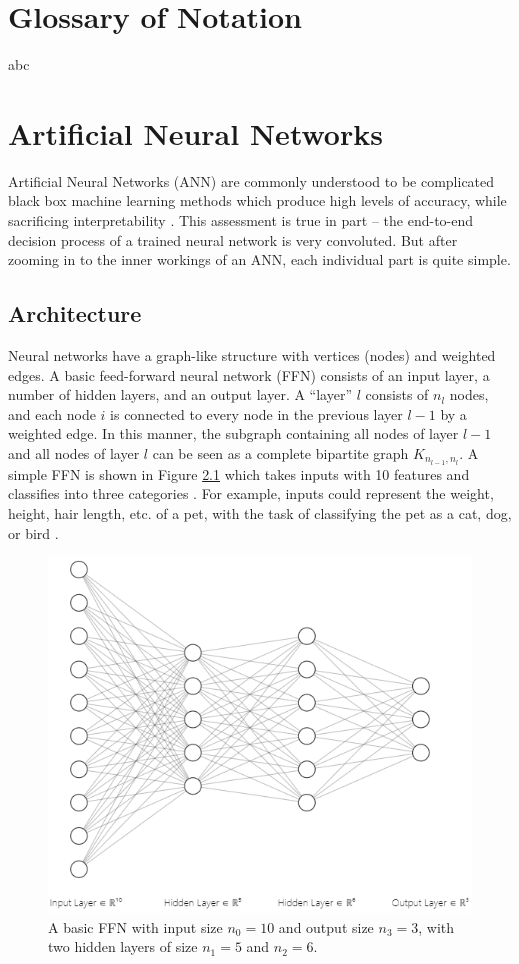 
\appendix \label{apdx}

\chapter{Glossary of Notation}
abc


\chapter{Artificial Neural Networks} \label{apdx:ann}
Artificial Neural Networks (ANN) are commonly understood to be complicated black box machine learning methods which produce high levels of accuracy, while sacrificing interpretability \cite{pattern_rec_book}. This assessment is true in part -- the end-to-end decision process of a trained neural network is very convoluted. But after zooming in to the inner workings of an ANN, each individual part is quite simple.

\section{Architecture}
Neural networks have a graph-like structure with vertices (nodes) and weighted edges. A basic feed-forward neural network (FFN) consists of an input layer, a number of hidden layers, and an output layer. A ``layer'' $l$ consists of $n_l$ nodes, and each node $i$ is connected to every node in the previous layer $l-1$ by a weighted edge. In this manner, the subgraph containing all nodes of layer $l-1$ and all nodes of layer $l$ can be seen as a complete bipartite graph $K_{n_{l-1}, n_l}$. A simple FFN is shown in Figure \ref{fig:fnn_example} which takes inputs with 10 features and classifies into three categories \cite{nn_svg}. For example, inputs could represent the weight, height, hair length, etc. of a pet, with the task of classifying the pet as a cat, dog, or bird \cite{neural_net}.

\begin{figure}[h]
  \centering
  \includegraphics[width=.85\textwidth]{img/ffn_visual.png}
  \caption{A basic FFN with input size $n_0 = 10$ and output size $n_3 = 3$, with two hidden layers of size $n_1 = 5$ and $n_2 = 6$.}
  \label{fig:fnn_example}
\end{figure}

